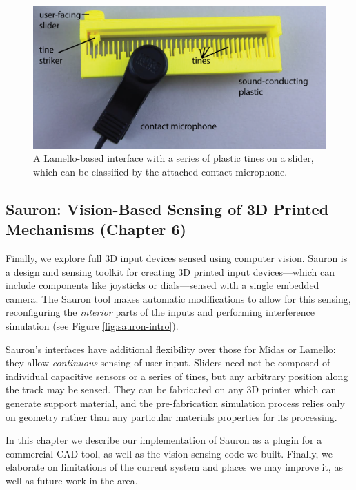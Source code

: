 \begin{figure}
\centering
\includegraphics[width=5in]{figures/lamello/lamello-intro-callouts.png}
\caption{A Lamello-based interface with a series of plastic tines on a slider, which can be classified by the attached contact microphone.}
\label{fig:lamello-intro}
\end{figure}

\subsection{Sauron: Vision-Based Sensing of 3D Printed Mechanisms (Chapter 6)}

Finally, we explore full 3D input devices sensed using computer vision. Sauron is a design and sensing toolkit for creating 3D printed input devices---which can include components like joysticks or dials---sensed with a single embedded camera. The Sauron tool makes automatic modifications to allow for this sensing, reconfiguring the \emph{interior} parts of the inputs and performing interference simulation (see Figure \ref{fig:sauron-intro}).

Sauron's interfaces have additional flexibility over those for Midas or Lamello: they allow \emph{continuous} sensing of user input. Sliders need not be composed of individual capacitive sensors or a series of tines, but any arbitrary position along the track may be sensed. They can be fabricated on any 3D printer which can generate support material, and the pre-fabrication simulation process relies only on geometry rather than any particular materials properties for its processing. %

In this chapter we describe our implementation of Sauron as a plugin for a commercial CAD tool, as well as the vision sensing code we built. Finally, we elaborate on limitations of the current system and places we may improve it, as well as future work in the area.

